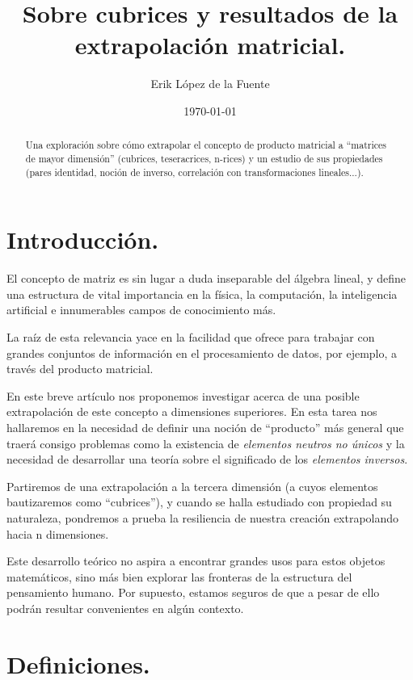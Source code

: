 \documentclass[a4paper, titlepage]{article}
\title{Sobre cubrices y resultados de la extrapolación matricial.}
\author{Erik López de la Fuente}
\date{\today}
\begin{document}
\maketitle

\begin{abstract}
	Una exploración sobre cómo extrapolar el concepto de producto matricial a ``matrices de mayor dimensión'' (cubrices, teseracrices, n-rices) y un estudio de sus propiedades (pares identidad, noción de inverso, correlación con transformaciones lineales...).
\end{abstract}

\tableofcontents
\newpage

\section{Introducción.}

El concepto de matriz es sin lugar a duda inseparable del álgebra lineal, y define una estructura de vital importancia en la física, la computación, la inteligencia artificial e innumerables campos de conocimiento más.

La raíz de esta relevancia yace en la facilidad que ofrece para trabajar con grandes conjuntos de información en el procesamiento de datos, por ejemplo, a través del producto matricial.

En este breve artículo nos proponemos investigar acerca de una posible extrapolación de este concepto a dimensiones superiores. En esta tarea nos hallaremos en la necesidad de definir una noción de ``producto'' más general que traerá consigo problemas como la existencia de \textit{elementos neutros no únicos} y la necesidad de desarrollar una teoría sobre el significado de los \textit{elementos inversos}.

Partiremos de una extrapolación a la tercera dimensión (a cuyos elementos bautizaremos como ``cubrices''), y cuando se halla estudiado con propiedad su naturaleza, pondremos a prueba la resiliencia de nuestra creación extrapolando hacia n dimensiones.

Este desarrollo teórico no aspira a encontrar grandes usos para estos objetos matemáticos, sino más bien explorar las fronteras de la estructura del pensamiento humano. Por supuesto, estamos seguros de que a pesar de ello podrán resultar convenientes en algún contexto.

\section{Definiciones.}
\end{document}
